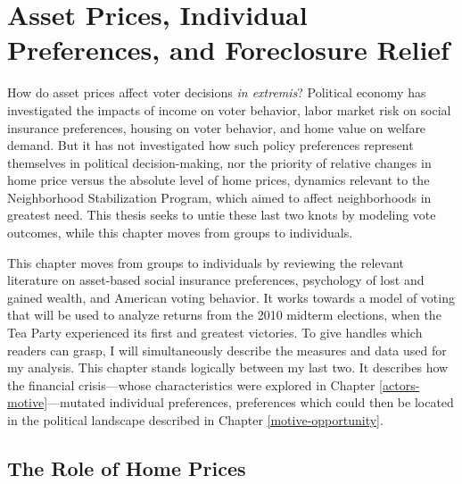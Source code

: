 \documentclass[
]{article}
\author{}
\date{\vspace{-2.5em}}
\begin{document}
{
\setcounter{tocdepth}{2}
\tableofcontents
}
\hypertarget{methods}{%
\section{Asset Prices, Individual Preferences, and Foreclosure Relief}\label{methods}}

How do asset prices affect voter decisions \emph{in extremis}?
Political economy has investigated the impacts of income on voter behavior, labor market risk on social insurance preferences, housing on voter behavior, and home value on welfare demand.
But it has not investigated how such policy preferences represent themselves in political decision-making, nor the priority of relative changes in home price versus the absolute level of home prices, dynamics relevant to the Neighborhood Stabilization Program, which aimed to affect neighborhoods in greatest need.
This thesis seeks to untie these last two knots by modeling vote outcomes, while this chapter moves from groups to individuals.

This chapter moves from groups to individuals by reviewing the relevant literature on asset-based social insurance preferences, psychology of lost and gained wealth, and American voting behavior.
It works towards a model of voting that will be used to analyze returns from the 2010 midterm elections, when the Tea Party experienced its first and greatest victories.
To give handles which readers can grasp, I will simultaneously describe the measures and data used for my analysis.
This chapter stands logically between my last two.
It describes how the financial crisis---whose characteristics were explored in Chapter \ref{actors-motive}---mutated individual preferences, preferences which could then be located in the political landscape described in Chapter \ref{motive-opportunity}.

\hypertarget{home-prices}{%
\subsection{The Role of Home Prices}\label{home-prices}}
\end{document}
